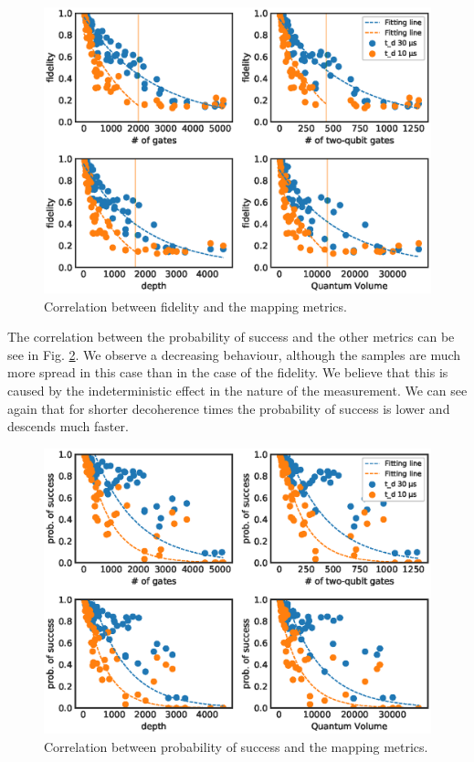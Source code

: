 \begin{figure}[htbp]
\centering
\includegraphics[width=\textwidth]{figures/f_metrics_correlation_poly.eps}
\caption{\label{fig:f_metrics_correlation}
Correlation between fidelity and the mapping metrics.}
\end{figure}

The correlation between the probability of success and the other metrics can be see in Fig. \ref{fig:ps_metrics_correlation}.
We observe a decreasing behaviour, although the samples are much more spread in this case than in the case of the fidelity. We believe that this is caused by the indeterministic effect in the nature of the measurement.
We can see again that for shorter decoherence times the probability of success is lower and descends much faster. 


\begin{figure}[htbp]
\centering
\includegraphics[width=\textwidth]{figures/ps_metrics_correlation.eps}
\caption{\label{fig:ps_metrics_correlation}
Correlation between probability of success and the mapping metrics.}
\end{figure}

